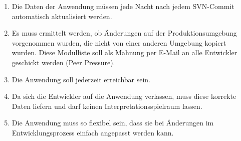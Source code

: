 \begin{enumerate}[itemsep=0em,partopsep=0em,parsep=0em,topsep=0em]
\begin{enumerate}
	\item Die Daten der Anwendung müssen jede Nacht \bzw nach jedem SVN-Commit automatisch aktualisiert werden.
	\item Es muss ermittelt werden, ob Änderungen auf der Produktionsumgebung vorgenommen wurden, die nicht von einer anderen Umgebung kopiert wurden. Diese Modulliste soll als Mahnung per E-Mail an alle Entwickler geschickt werden (Peer Pressure).
	\item Die Anwendung soll jederzeit erreichbar sein.
	\item Da sich die Entwickler auf die Anwendung verlassen, muss diese korrekte Daten liefern und darf keinen Interpretationsspielraum lassen.
	\item Die Anwendung muss so flexibel sein, dass sie bei Änderungen im Entwicklungsprozess einfach angepasst werden kann.
	\end{enumerate}
\end{enumerate}

